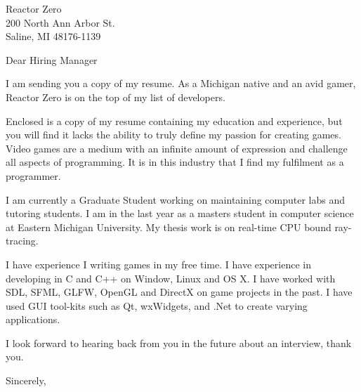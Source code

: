 \documentclass{letter}
\begin{document}
\begin{letter}{ Reactor Zero \\ 200 North Ann Arbor St. \\ Saline, MI 48176-1139 }

\opening{Dear Hiring Manager}

I am sending you a copy of my resume.  As a Michigan native and an avid gamer, Reactor Zero is on the top of my list of developers.  

Enclosed is a copy of my resume containing my education and experience, but you will find it lacks the ability to truly define my passion for creating games.  Video games are a medium with an infinite amount of expression and challenge all aspects of programming.  It is in this industry that I find my fulfilment as a programmer.

I am currently a Graduate Student working on maintaining computer labs and tutoring students.   I am in the last year as a masters student in computer science at Eastern Michigan University.  My thesis work is on real-time CPU bound ray-tracing.

I have experience I writing games in my free time.  I have experience in developing in C and C++ on Window, Linux and OS X.  I have worked with SDL, SFML, GLFW, OpenGL and DirectX on game projects in the past.  I have used GUI tool-kits such as Qt, wxWidgets, and .Net to create varying applications.

I look forward to hearing back from you in the future about an interview, thank you.

\closing{Sincerely,}
\end{letter}
\end{document}
